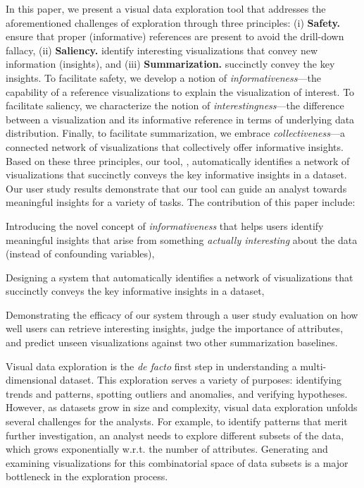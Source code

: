 \par In this paper, we present a visual data exploration tool that addresses the aforementioned challenges of exploration through three principles: (i) \textbf{Safety.} ensure that proper (informative) references are present to avoid the drill-down fallacy, (ii)  \textbf{Saliency.} identify interesting visualizations that convey new information (insights), and (iii) \textbf{Summarization.} succinctly convey the key insights. To facilitate safety, we develop a notion of \emph{informativeness}---the capability of a reference visualizations to explain the visualization of interest. To facilitate saliency, we characterize the notion of \emph{interestingness}---the difference between a visualization and its informative reference in terms of underlying data distribution. Finally, to facilitate summarization, we embrace \emph{collectiveness}---a connected network of visualizations that collectively offer informative insights. Based on these three principles, our tool, \system, automatically identifies a network of visualizations that succinctly conveys the key informative insights in a dataset. Our user study results demonstrate that our tool can guide an analyst towards meaningful insights for a variety of tasks. The contribution of this paper include:
\begin{denselist}
\item Introducing the novel concept of \emph{informativeness} that helps users identify meaningful insights that arise from something \textit{actually interesting} about the data (instead of confounding variables),
\item Designing a system that automatically identifies a network of visualizations that succinctly conveys the key informative insights in a dataset,
\item Demonstrating the efficacy of our system through a user study evaluation on how well users can retrieve interesting insights, judge the importance of attributes, and predict unseen visualizations against two other summarization baselines.
\end{denselist}

\iffalse

Visual data exploration is the \emph{de facto} first step in understanding a multi-dimensional dataset. This exploration serves a variety of purposes: identifying trends and patterns, spotting outliers and anomalies, and verifying hypotheses. However, as datasets grow in size and complexity, visual data exploration unfolds several challenges for the analysts. For example, to identify patterns that merit further investigation, an analyst needs to explore different subsets of the data, which grows exponentially w.r.t. the number of attributes. Generating and examining visualizations for this combinatorial space of data subsets is a major bottleneck in the exploration process.

